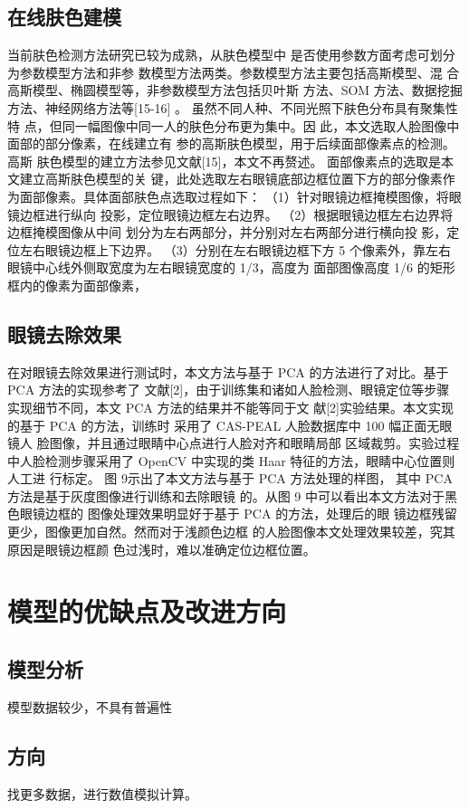 \documentclass[12pt]{article}
\begin{document}
{       \subsection{在线肤色建模}
         \par 当前肤色检测方法研究已较为成熟，从肤色模型中
         是否使用参数方面考虑可划分为参数模型方法和非参
         数模型方法两类。参数模型方法主要包括高斯模型、混
         合高斯模型、椭圆模型等，非参数模型方法包括贝叶斯
         方法、SOM 方法、数据挖掘方法、神经网络方法等[15-16]
         。
         虽然不同人种、不同光照下肤色分布具有聚集性特
         点，但同一幅图像中同一人的肤色分布更为集中。因
         此，本文选取人脸图像中面部的部分像素，在线建立有
         参的高斯肤色模型，用于后续面部像素点的检测。高斯
         肤色模型的建立方法参见文献[15]，本文不再赘述。
         面部像素点的选取是本文建立高斯肤色模型的关
         键，此处选取左右眼镜底部边框位置下方的部分像素作
         为面部像素。具体面部肤色点选取过程如下：
         （1）针对眼镜边框掩模图像，将眼镜边框进行纵向
         投影，定位眼镜边框左右边界。
         （2）根据眼镜边框左右边界将边框掩模图像从中间
         划分为左右两部分，并分别对左右两部分进行横向投
         影，定位左右眼镜边框上下边界。
         （3）分别在左右眼镜边框下方 5 个像素外，靠左右
         眼镜中心线外侧取宽度为左右眼镜宽度的 1/3，高度为
         面部图像高度 1/6 的矩形框内的像素为面部像素，

         \subsection{眼镜去除效果}
         \par

         在对眼镜去除效果进行测试时，本文方法与基于
PCA 的方法进行了对比。基于 PCA 方法的实现参考了
文献[2]，由于训练集和诸如人脸检测、眼镜定位等步骤
实现细节不同，本文 PCA 方法的结果并不能等同于文
献[2]实验结果。本文实现的基于 PCA 的方法，训练时
采用了 CAS-PEAL 人脸数据库中 100 幅正面无眼镜人
脸图像，并且通过眼睛中心点进行人脸对齐和眼睛局部
区域裁剪。实验过程中人脸检测步骤采用了 OpenCV
中实现的类 Haar 特征的方法，眼睛中心位置则人工进
行标定。
图 9示出了本文方法与基于 PCA 方法处理的样图，
其中 PCA 方法是基于灰度图像进行训练和去除眼镜
的。从图 9 中可以看出本文方法对于黑色眼镜边框的
图像处理效果明显好于基于 PCA 的方法，处理后的眼
镜边框残留更少，图像更加自然。然而对于浅颜色边框
的人脸图像本文处理效果较差，究其原因是眼镜边框颜
色过浅时，难以准确定位边框位置。
       {\centering\section{模型的优缺点及改进方向}}
       \subsection{模型分析}
         \par 模型数据较少，不具有普遍性
         \subsection{方向}
         \par 找更多数据，进行数值模拟计算。
      
   }
\end{document}
